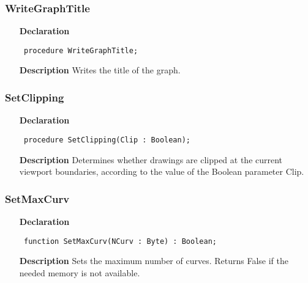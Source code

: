 \documentclass[12pt,a4paper,oneside]{report}
\newcommand{\declarationitem}[1]{\textbf{#1}}
\newcommand{\descriptiontitle}[1]{\textbf{#1}}
\newcommand{\code}[1]{\texttt{#1}}
\begin{document}
\subsubsection{WriteGraphTitle}
\label{uplot-WriteGraphTitle}
\begin{itemize}\item[\declarationitem{Declaration}\hfill]
	\begin{flushleft}
		\code{
			procedure WriteGraphTitle;}
		
	\end{flushleft}
	
	\par
	\item[\descriptiontitle{Description}]
	Writes the title of the graph.
	
\end{itemize}
\subsubsection{SetClipping}
\label{uplot-SetClipping}
\begin{itemize}\item[\declarationitem{Declaration}\hfill]
	\begin{flushleft}
		\code{
			procedure SetClipping(Clip : Boolean);}
		
	\end{flushleft}
	
	\par
	\item[\descriptiontitle{Description}]
	Determines whether drawings are clipped at the current viewport boundaries, according to the value of the Boolean parameter Clip.
	
\end{itemize}
\subsubsection{SetMaxCurv}
\label{uplot-SetMaxCurv}
\begin{itemize}\item[\declarationitem{Declaration}\hfill]
	\begin{flushleft}
		\code{
			function SetMaxCurv(NCurv : Byte) : Boolean;}
		
	\end{flushleft}
	
	\par
	\item[\descriptiontitle{Description}]
	Sets the maximum number of curves. Returns False if the needed memory is not available.
	
\end{itemize}
\end{document}
